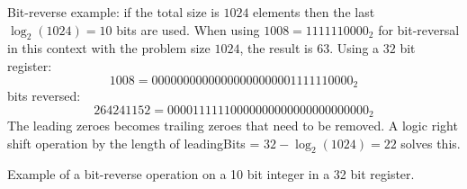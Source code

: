 Bit-reverse example: if the total size is $1024$ elements then the last $\log_{2}(1024) = 10$ bits are used. When using $1008 = 1111110000_{2}$ for bit-reversal in this context with the problem size $1024$, the result is $63$. Using a $32$ bit register:
\begin{equation}
	1008 = 00000000000000000000001111110000_{2}
\end{equation}
bits reversed:
\begin{equation}
	264241152 = 00001111110000000000000000000000_{2} 
\end{equation}
The leading zeroes becomes trailing zeroes that need to be removed. A logic right shift operation by the length of leadingBits = $32 - \log_{2}(1024) = 22$ solves this.

\begin{table}
	\centering

	\caption{Example of a bit-reverse operation on a 10 bit integer in a 32 bit register.}
\end{table}